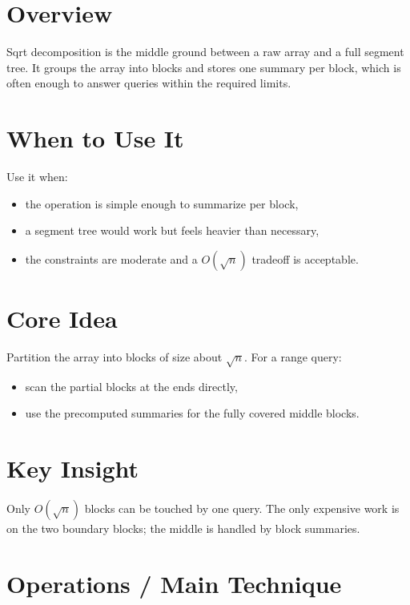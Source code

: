\section*{Overview}

Sqrt decomposition is the middle ground between a raw array and a full segment tree. It groups the array into blocks
and stores one summary per block, which is often enough to answer queries within the required limits.

\section*{When to Use It}

Use it when:

\begin{itemize}
  \item the operation is simple enough to summarize per block,
  \item a segment tree would work but feels heavier than necessary,
  \item the constraints are moderate and a \(O(\sqrt{n})\) tradeoff is acceptable.
\end{itemize}

\section*{Core Idea}

Partition the array into blocks of size about \(\sqrt{n}\). For a range query:

\begin{itemize}
  \item scan the partial blocks at the ends directly,
  \item use the precomputed summaries for the fully covered middle blocks.
\end{itemize}

\section*{Key Insight}

Only \(O(\sqrt{n})\) blocks can be touched by one query. The only expensive work is on the two boundary blocks; the
middle is handled by block summaries.

\section*{Operations / Main Technique}

